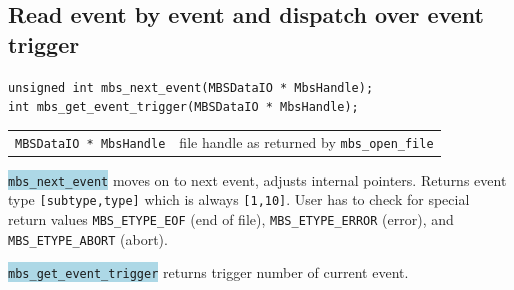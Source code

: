 \documentclass[10pt,a4paper]{article}
\newcommand{\blue}[1]{\colorbox{lightblue}{\texttt{#1}}}
\newenvironment{blueboxed}
	{\begin{Sbox}\begin{minipage}[t]}
	{\end{minipage}\end{Sbox}\colorbox{lightblue}{\TheSbox}}
\begin{document}
\subsection{Read event by event and dispatch over event trigger}\vspace{3mm}
\begin{center}
\begin{blueboxed}{.7\linewidth}
	\verb+unsigned int mbs_next_event(MBSDataIO * MbsHandle);+\\
	\verb+int mbs_get_event_trigger(MBSDataIO * MbsHandle);+
\end{blueboxed}
\end{center}
\begin{center}
\begin{tabular}{ll}
\verb+MBSDataIO * MbsHandle+	& file handle as returned by \verb+mbs_open_file+\\
\end{tabular}
\end{center}
\blue{mbs\_next\_event} moves on to next event, adjusts internal pointers.
Returns event type \verb+[subtype,type]+ which is always \verb+[1,10]+.
User has to check for special return values \verb+MBS_ETYPE_EOF+ (end of file),
\verb+MBS_ETYPE_ERROR+ (error), and \verb+MBS_ETYPE_ABORT+ (abort).

\blue{mbs\_get\_event\_trigger} returns trigger number of current event.
\vspace{5mm}
\end{document}
